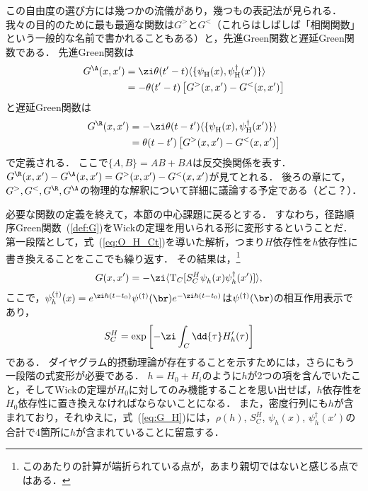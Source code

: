 \documentclass[a4paper,10pt]{jsarticle}
\newcommand{\mH}{\mathrm{H}}
\begin{document}
この自由度の選び方には幾つかの流儀があり，幾つもの表記法が見られる．
我々の目的のために最も最適な関数は$G^{>}$と$G^{<}$（これらはしばしば「相関関数」という一般的な名前で書かれることもある）と，先進Green関数と遅延Green関数である．
先進Green関数は
\begin{align}
G^{\A} (x, x')
	& = \zi \theta (t' - t) \langle \{ \psi^{}_{\mH} (x), \psi^{\dagger}_{\mH} (x') \} \rangle
\notag \\
	& = - \theta (t' - t) \left[ G^{>} (x, x') - G^{<} (x, x') \right]
\label{def:G^A}
\end{align}
と遅延Green関数は
\begin{align}
G^{\R} (x, x')
	& = - \zi \theta (t - t') \langle \{ \psi^{}_{\mH} (x), \psi^{\dagger}_{\mH} (x') \} \rangle
\notag \\
	& = \theta (t - t') \left[ G^{>} (x, x') - G^{<} (x, x') \right]
\label{def:G^R}
\end{align}
で定義される．
ここで$\{A, B\} = A B + B A$は反交換関係を表す．
$G^{\R} (x, x') - G^{\A} (x, x') = G^{>} (x, x') - G^{<} (x, x')$が見てとれる．
後ろの章にて，$G^{>}, G^{<}, G^{\R}, G^{\A}$の物理的な解釈について詳細に議論する予定である（{\color{red}どこ？}）．

必要な関数の定義を終えて，本節の中心課題に戻るとする．
すなわち，径路順序Green関数~(\ref{def:G})をWickの定理を用いられる形に変形するということだ．
第一段階として，式~(\ref{eq:O_H_Ct})を導いた解析，つまり$H$依存性を$h$依存性に書き換えることをここでも繰り返す．
その結果は，\footnote{{\color{red} このあたりの計算が端折られている点が，あまり親切ではないと感じる点ではある．}}
\begin{align}
G (x, x')
	& = - \zi \langle \mathrm{T}_C [ S_{C}^{H} \psi^{}_{h} (x) \psi^{\dagger}_{h} (x') ] \rangle
\label{eq:G_H}
,\end{align}
ここで，$\psi^{(\dagger)}_{h} (x) = e^{\zi h (t - t_0)} \psi^{(\dagger)} (\br) e^{- \zi h (t - t_0)}$は$\psi^{(\dagger)} (\br)$の相互作用表示であり，
\begin{align}
S_{C}^{H}
	& = \exp \left[ - \zi \int_{C} \dd{\tau} H'_{h} (\tau) \right]
\end{align}
である．
ダイヤグラム的摂動理論が存在することを示すためには，さらにもう一段階の式変形が必要である．
$h = H_0 + H_i$のように$h$が2つの項を含んでいたこと，そしてWickの定理が$H_0$に対してのみ機能することを思い出せば，$h$依存性を$H_0$依存性に置き換えなければならないことになる．
また，密度行列にも$h$が含まれており，それゆえに，式~(\ref{eq:G_H})には，$\rho (h)$, $S_{C}^{H}$, $\psi^{}_h (x)$, $\psi^{\dagger}_h (x')$の合計で4箇所に$h$が含まれていることに留意する．
\end{document}
